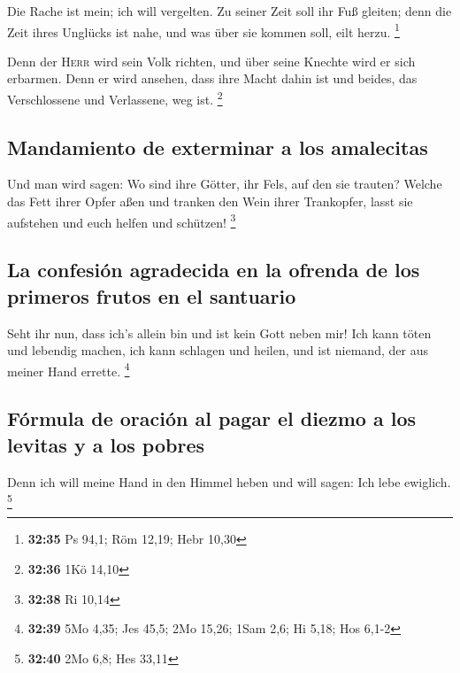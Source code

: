  Die Rache ist mein; ich will vergelten. Zu seiner Zeit
soll ihr Fuß gleiten; denn die Zeit ihres Unglücks ist nahe, und was
über sie kommen soll, eilt herzu. \footnote{\textbf{32:35} Ps 94,1; Röm
  12,19; Hebr 10,30}

 Denn der \textsc{Herr} wird sein Volk richten, und über
seine Knechte wird er sich erbarmen. Denn er wird ansehen, dass ihre
Macht dahin ist und beides, das Verschlossene und Verlassene, weg ist.
\footnote{\textbf{32:36} 1Kö 14,10}

\hypertarget{mandamiento-de-exterminar-a-los-amalecitas}{%
\subsection{Mandamiento de exterminar a los
amalecitas}\label{mandamiento-de-exterminar-a-los-amalecitas}}

 Und man wird sagen: Wo sind ihre Götter, ihr Fels, auf
den sie trauten?  Welche das Fett ihrer Opfer aßen und
tranken den Wein ihrer Trankopfer, lasst sie aufstehen und euch helfen
und schützen! \footnote{\textbf{32:38} Ri 10,14}

\hypertarget{la-confesiuxf3n-agradecida-en-la-ofrenda-de-los-primeros-frutos-en-el-santuario}{%
\subsection{La confesión agradecida en la ofrenda de los primeros frutos
en el
santuario}\label{la-confesiuxf3n-agradecida-en-la-ofrenda-de-los-primeros-frutos-en-el-santuario}}

 Seht ihr nun, dass ich's allein bin und ist kein Gott
neben mir! Ich kann töten und lebendig machen, ich kann schlagen und
heilen, und ist niemand, der aus meiner Hand errette. \footnote{\textbf{32:39}
  5Mo 4,35; Jes 45,5; 2Mo 15,26; 1Sam 2,6; Hi 5,18; Hos 6,1-2}

\hypertarget{fuxf3rmula-de-oraciuxf3n-al-pagar-el-diezmo-a-los-levitas-y-a-los-pobres}{%
\subsection{Fórmula de oración al pagar el diezmo a los levitas y a los
pobres}\label{fuxf3rmula-de-oraciuxf3n-al-pagar-el-diezmo-a-los-levitas-y-a-los-pobres}}

 Denn ich will meine Hand in den Himmel heben und will
sagen: Ich lebe ewiglich. \footnote{\textbf{32:40} 2Mo 6,8; Hes 33,11}

